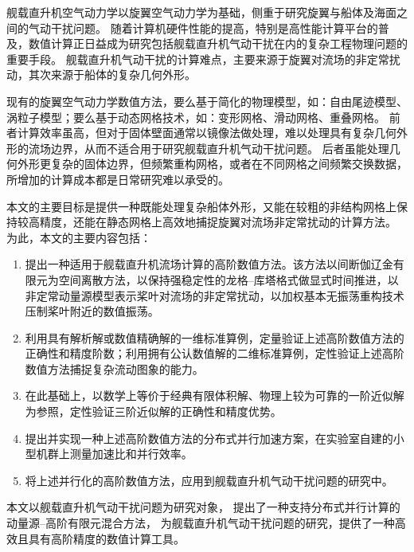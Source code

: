 
\begin{cabstract}
舰载直升机空气动力学以旋翼空气动力学为基础，侧重于研究旋翼与船体及海面之间的气动干扰问题。
随着计算机硬件性能的提高，特别是高性能计算平台的普及，数值计算正日益成为研究包括舰载直升机气动干扰在内的复杂工程物理问题的重要手段。
舰载直升机气动干扰的计算难点，主要来源于旋翼对流场的非定常扰动，其次来源于船体的复杂几何外形。

现有的旋翼空气动力学数值方法，要么基于简化的物理模型，如：自由尾迹模型、涡粒子模型；要么基于动态网格技术，如：变形网格、滑动网格、重叠网格。
前者计算效率虽高，但对于固体壁面通常以镜像法做处理，难以处理具有复杂几何外形的流场边界，从而不适合用于研究舰载直升机气动干扰问题。
后者虽能处理几何外形更复杂的固体边界，但频繁重构网格，或者在不同网格之间频繁交换数据，所增加的计算成本都是日常研究难以承受的。

本文的主要目标是提供一种既能处理复杂船体外形，又能在较粗的非结构网格上保持较高精度，还能在静态网格上高效地捕捉旋翼对流场非定常扰动的计算方法。
为此，本文的主要内容包括：
\begin{enumerate}[wide]
\item 提出一种适用于舰载直升机流场计算的高阶数值方法。该方法以间断伽辽金有限元为空间离散方法，以保持强稳定性的龙格--库塔格式做显式时间推进，以非定常动量源模型表示桨叶对流场的非定常扰动，以加权基本无振荡重构技术压制桨叶附近的数值振荡。
\item 利用具有解析解或数值精确解的一维标准算例，定量验证上述高阶数值方法的正确性和精度阶数；利用拥有公认数值解的二维标准算例，定性验证上述高阶数值方法捕捉复杂流动图象的能力。
\item 在此基础上，以数学上等价于经典有限体积解、物理上较为可靠的一阶近似解为参照，定性验证三阶近似解的正确性和精度优势。
\item 提出并实现一种上述高阶数值方法的分布式并行加速方案，在实验室自建的小型机群上测量加速比和并行效率。
\item 将上述并行化的高阶数值方法，应用到舰载直升机气动干扰问题的研究中。
\end{enumerate}

本文以舰载直升机气动干扰问题为研究对象，
提出了一种支持分布式并行计算的动量源--高阶有限元混合方法，
为舰载直升机气动干扰问题的研究，提供了一种高效且具有高阶精度的数值计算工具。
\end{cabstract}

